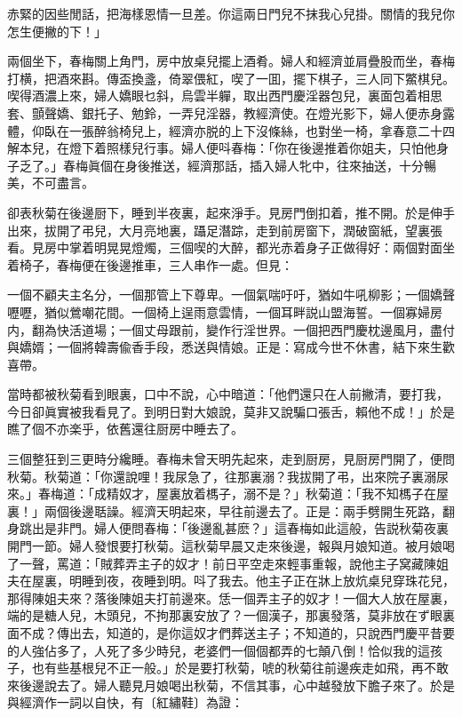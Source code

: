 \begin{myquote}
赤緊的因些閒話，把海樣恩情一旦差。你這兩日門兒不抹我心兒掛。關情的我兒你怎生便撇的下！」
\end{myquote}

兩個坐下，春梅關上角門，房中放桌兒擺上酒肴。婦人和經濟並肩疊股而坐，春梅打横，把酒來斟。傳盃換盞，倚翠偎紅，喫了一囬，擺下棋子，三人同下鱉棋兒。喫得酒濃上來，婦人嬌眼乜斜，烏雲半軃，取出西門慶淫器包兒，裏面包着相思套、顫聲嬌、銀托子、勉鈴，一弄兒淫器，教經濟使。在燈光影下，婦人便赤身露體，仰臥在一張醉翁椅兒上，經濟亦脱的上下沒條絲，也對坐一椅，拿春意二十四解本兒，在燈下着照樣兒行事。婦人便呌春梅：「你在後邊推着你姐夫，只怕他身子乏了。」春梅眞個在身後推送，經濟那話，插入婦人牝中，往來抽送，十分暢美，不可盡言。

卻表秋菊在後邊厨下，睡到半夜裏，起來淨手。見房門倒扣着，推不開。於是伸手出來，拔開了弔兒，大月亮地裏，躡足潛踪，走到前房窗下，潤破窗紙，望裏張看。見房中掌着明晃晃燈燭，三個喫的大醉，都光赤着身子正做得好：兩個對面坐着椅子，春梅便在後邊推車，三人串作一處。但見：

\begin{myquote}
一個不顧夫主名分，一個那管上下尊卑。一個氣喘吁吁，猶如牛吼柳影；一個嬌聲嚦嚦，猶似鶯嘲花間。一個椅上逞雨意雲情，一個耳畔説山盟海誓。一個寡婦房内，翻為快活道場；一個丈母跟前，變作行淫世界。一個把西門慶枕邊風月，盡付與嬌婿；一個將韓壽偸香手段，悉送與情娘。正是：寫成今世不休書，結下來生歡喜帶。
\end{myquote}

當時都被秋菊看到眼裏，口中不說，心中暗道：「他們還只在人前撇清，要打我，今日卻眞實被我看見了。到明日對大娘說，莫非又說騙口張舌，賴他不成！」於是瞧了個不亦楽乎，依舊還往厨房中睡去了。

三個整狂到三更時分纔睡。春梅未曾天明先起來，走到厨房，見厨房門開了，便問秋菊。秋菊道：「你還說哩！我尿急了，往那裏溺？我拔開了弔，出來院子裏溺尿來。」春梅道：「成精奴才，屋裏放着榪子，溺不是？」秋菊道：「我不知榪子在屋裏！」兩個後邊聒譟。經濟天明起來，早往前邊去了。正是：兩手劈開生死路，翻身跳出是非門。婦人便問春梅：「後邊亂甚麽？」這春梅如此這般，告説秋菊夜裏開門一節。婦人發恨要打秋菊。這秋菊早晨又走來後邊，報與月娘知道。被月娘喝了一聲，罵道：「賊葬弄主子的奴才！前日平空走來輕事重報，說他主子窝藏陳姐夫在屋裏，明睡到夜，夜睡到明。呌了我去。他主子正在牀上放炕桌兒穿珠花兒，那得陳姐夫來？落後陳姐夫打前邊來。恁一個弄主子的奴才！一個大人放在屋裏，端的是糖人兒，木頭兒，不拘那裏安放了？一個漢子，那裏發落，莫非放在ず眼裏面不成？傳出去，知道的，是你這奴才們葬送主子；不知道的，只說西門慶平昔要的人強佔多了，人死了多少時兒，老婆們一個個都弄的七顛八倒！恰似我的這孩子，也有些基根兒不正一般。」於是要打秋菊，唬的秋菊往前邊疾走如飛，再不敢來後邊說去了。婦人聽見月娘喝出秋菊，不信其事，心中越發放下膽子來了。於是與經濟作一詞以自快，有〔紅繡鞋〕為證：

